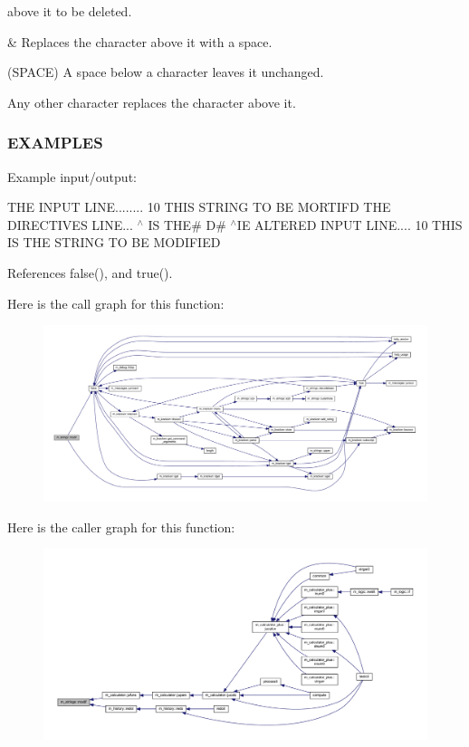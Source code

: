 above it to be deleted.

\& Replaces the character above it with a space.

(S\+P\+A\+CE) A space below a character leaves it unchanged.

Any other character replaces the character above it.

\subsubsection*{E\+X\+A\+M\+P\+L\+ES}

Example input/output\+:

T\+HE I\+N\+P\+UT L\+I\+NE........ 10 T\+H\+IS S\+T\+R\+I\+NG TO BE M\+O\+R\+T\+I\+FD T\+HE D\+I\+R\+E\+C\+T\+I\+V\+ES L\+I\+NE... $^\wedge$ IS T\+HE\# D\# $^\wedge$\+IE A\+L\+T\+E\+R\+ED I\+N\+P\+UT L\+I\+NE.... 10 T\+H\+IS IS T\+HE S\+T\+R\+I\+NG TO BE M\+O\+D\+I\+F\+I\+ED 

References false(), and true().

Here is the call graph for this function\+:
\nopagebreak
\begin{figure}[H]
\begin{center}
\leavevmode
\includegraphics[width=350pt]{namespacem__strings_aec887410b018916a683fbb2ae529f8c5_cgraph}
\end{center}
\end{figure}
Here is the caller graph for this function\+:
\nopagebreak
\begin{figure}[H]
\begin{center}
\leavevmode
\includegraphics[width=350pt]{namespacem__strings_aec887410b018916a683fbb2ae529f8c5_icgraph}
\end{center}
\end{figure}
\mbox{\label{namespacem__strings_a5d72fde097444c689f1822c5ad95e03d}} 
